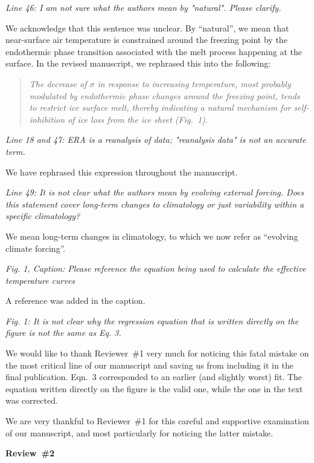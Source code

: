 \documentclass[10pt]{article}
\def\referee#1{\bigskip\textcolor{blue!50!black}{\textit{#1}}}
\def\msquote#1{\begin{quote}\textit{#1}\end{quote}}
\begin{document}
\referee{Line 46: I am not sure what the authors mean by "natural". Please clarify.}

We acknowledge that this sentence was unclear. By ``natural'', we mean that near-surface air temperature is constrained around the freezing point by the endothermic phase transition associated with the melt process happening at the surface. In the revised manuscript, we rephrased this into the following:

\msquote{The decrease of $\sigma$ in response to increasing temperature, most probably modulated by endothermic phase changes around the freezing point, tends to restrict ice surface melt, thereby indicating a natural mechanism for self-inhibition of ice loss from the ice sheet (Fig.~1).}

\referee{Line 18 and 47: ERA is a reanalysis of data; "reanalysis data" is not an accurate term.}

We have rephrased this expression throughout the manuscript.

\referee{Line 49: It is not clear what the authors mean by evolving external forcing. Does this statement cover long-term changes to climatology or just variability within a specific climatology?}

We mean long-term changes in climatology, to which we now refer as ``evolving climate forcing''.

\referee{Fig. 1, Caption: Please reference the equation being used to calculate the effective temperature curves}

A reference was added in the caption.

\referee{Fig. 1: It is not clear why the regression equation that is written directly on the figure is not the same as Eq. 3.}

We would like to thank Reviewer~{\#}1 very much for noticing this fatal mistake on the most critical line of our manuscript and saving us from including it in the final publication. Eqn.~3 corresponded to an earlier (and slightly worst) fit. The equation written directly on the figure is the valid one, while the one in the text was corrected.

We are very thankful to Reviewer~{\#}1 for this careful and supportive examination of our manuscript, and most particularly for noticing the latter mistake.


\bigskip
\textbf{Review~{\#}2}

\end{document}
